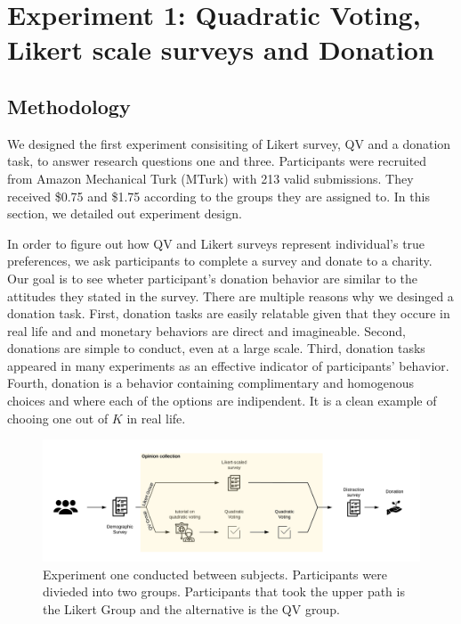 \section{Experiment 1: Quadratic Voting, Likert scale surveys and Donation}
\subsection{Methodology} \label{method-1}
We designed the first experiment 
consisiting of Likert survey, QV and a donation task,
to answer research questions one and three. 
Participants were recruited from Amazon Mechanical Turk (MTurk)
with 213 valid submissions. %
They received \$0.75 and \$1.75 according to the groups they are assigned to.
In this section, 
we detailed out experiment design.

In order to figure out 
how QV and Likert surveys 
represent individual's true preferences,
we ask participants to complete a survey
and donate to a charity.
Our goal is to see 
wheter participant's donation behavior are similar to 
the attitudes they stated in the survey.
There are multiple reasons
why we desinged a donation task.
First, donation tasks are easily relatable
given that they occure in real life and
and monetary behaviors are direct and imagineable.
Second, donations are simple to conduct,
even at a large scale.
Third, donation tasks appeared in many experiments 
\cite{Xiao2019, benz2008people, gendall2010effect} 
as an effective indicator of participants' behavior.
Fourth, donation is a behavior containing
complimentary and homogenous choices and
where each of the options are indipendent.
It is a clean example of chooing one out of $K$ in real life.

\begin{figure}[htpb]
    \centering
    \includegraphics[width=\textwidth, keepaspectratio=true]{content/image/exp1_flow.png}
    \caption{
        Experiment one conducted between subjects. Participants were divieded into two groups. Participants that took the upper path is the Likert Group and the alternative is the QV group.
    }
    \label{fig:exp1_image_flow}
\end{figure}

